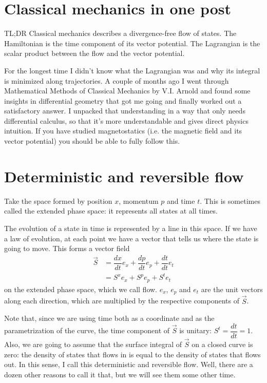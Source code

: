 \documentclass[aps,pra,10pt,floatfix,nofootinbib]{revtex4-1}
\theoremstyle{definition}
\begin{document}
	
\section{Classical mechanics in one post}

TL;DR Classical mechanics describes a divergence-free flow of states. The Hamiltonian is the time component of its vector potential. The Lagrangian is the scalar product between the flow and the vector potential.

For the longest time I didn't know what the Lagrangian was and why its integral is minimized along trajectories. A couple of months ago I went through Mathematical Methods of Classical Mechanics by V.I. Arnold and found some insights in differential geometry that got me going and finally worked out a satisfactory answer. I unpacked that understanding in a way that only needs differential calculus, so that it's more understandable and gives direct physics intuition. If you have studied magnetostatics (i.e. the magnetic field and its vector potential) you should be able to fully follow this.

\section{Deterministic and reversible flow}

Take the space formed by position $x$, momentum $p$ and time $t$. This is sometimes called the extended phase space: it represents all states at all times.

The evolution of a state in time is represented by a line in this space. If we have a law of evolution, at each point we have a vector that tells us where the state is going to move. This forms a vector field
\begin{equation}
\begin{aligned}
\vec{S} &= \dfrac{dx}{dt} e_x + \dfrac{dp}{dt} e_p + \dfrac{dt}{dt} e_t \\ 
&= S^x e_x + S^p e_p + S^t e_t 
\end{aligned}
\label{flow}
\end{equation}
 on the extended phase space, which we call flow. $e_x$, $e_p$ and $e_t$ are the unit vectors along each direction, which are multiplied by the respective components of $\vec{S}$.

Note that, since we are using time both as a coordinate and as the parametrization of the curve, the time component of $\vec{S}$ is unitary: $S^t = \dfrac{dt}{dt} = 1$. Also, we are going to assume that the surface integral of $\vec{S}$ on a closed curve is zero: the density of states that flows in is equal to the density of states that flows out. In this sense, I call this deterministic and reversible flow. Well, there are a dozen other reasons to call it that, but we will see them some other time.
\end{document}
